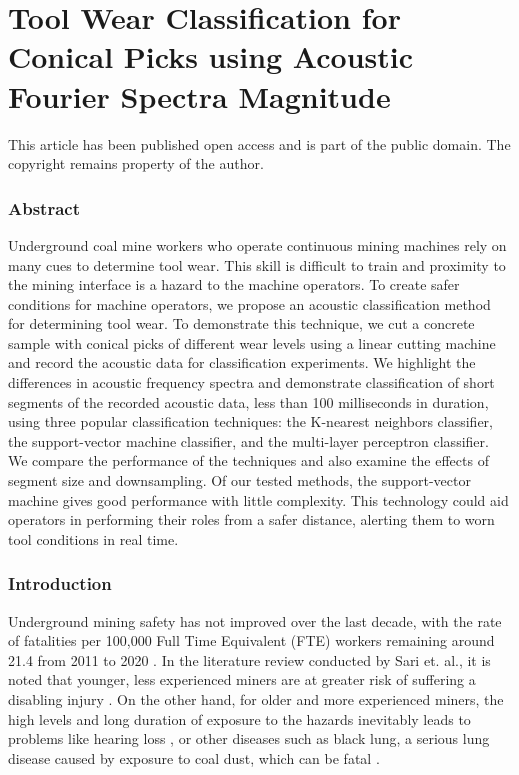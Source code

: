 
\chapter{Tool Wear Classification for Conical Picks
using Acoustic Fourier Spectra Magnitude \label{chap:P2}}

\begin{center}
This article has been published open access and is part of the public domain.
The copyright remains property of the author.
\end{center}

\subsection{Abstract}

Underground coal mine workers who operate continuous mining machines 
rely on many cues to determine tool wear. 
This skill is difficult to train and proximity to the
mining interface is a hazard to the machine operators. 
To create safer conditions for machine operators, we propose an acoustic classification method for determining tool wear.
To demonstrate this technique, we cut a concrete sample with conical picks of different wear levels
 using a linear cutting machine and record the acoustic data for classification experiments.
We highlight the differences in acoustic frequency spectra and
 demonstrate classification of short segments of the recorded acoustic data, less than 100 milliseconds in duration,
using three popular classification techniques: the K-nearest neighbors classifier, 
 the support-vector machine classifier, and the multi-layer perceptron classifier. 
We compare the performance of the techniques and also examine the effects of segment size and downsampling.
Of our tested methods, the support-vector machine gives good performance with little complexity.
This technology could aid operators in performing their roles from a safer distance, 
alerting them to worn tool conditions in real time.


\subsection{Introduction}\label{sec1}

Underground mining safety has not improved over the last decade, with the rate of fatalities
per 100,000 Full Time Equivalent (FTE) workers remaining around 21.4 from 2011 to 2020 \cite{nioshdata}. 
In the literature review conducted by Sari et. al., it is noted that younger, less experienced
miners are at greater risk of suffering a disabling injury \cite{Sari2004}.
On the other hand, for older and more experienced miners, 
the high levels and long duration of exposure to the hazards inevitably leads to problems
like hearing loss \cite{Erol2022}, or other diseases such as black lung, 
a serious lung disease caused by exposure to coal dust, which can be fatal \cite{Colinent2020}.

